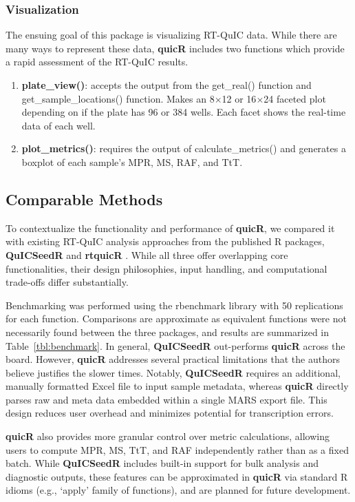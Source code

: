 \documentclass[preprint,12pt,a4paper]{elsarticle}
\begin{document}
            \subsubsection{Visualization}
                The ensuing goal of this package is visualizing RT-QuIC data. While there are many ways to represent these data, \textbf{quicR} includes two functions which provide a rapid assessment of the RT-QuIC results.
                \begin{enumerate}
                    \item \textbf{plate\_view()}: accepts the output from the get\_real() function and get\_sample\_locations() function. Makes an 8$\times$12 or 16$\times$24 faceted plot depending on if the plate has 96 or 384 wells. Each facet shows the real-time data of each well.
                    \item \textbf{plot\_metrics()}: requires the output of calculate\_metrics() and generates a boxplot of each sample's MPR, MS, RAF, and TtT.
                \end{enumerate}
        
        \subsection{Comparable Methods}
            To contextualize the functionality and performance of \textbf{quicR}, we compared it with existing RT-QuIC analysis approaches from the published R packages, \textbf{QuICSeedR} \cite{Li2025} and \textbf{rtquicR} \cite{Slota2023}. While all three offer overlapping core functionalities, their design philosophies, input handling, and computational trade-offs differ substantially.

            Benchmarking was performed using the rbenchmark library \cite{rbenchmark} with 50 replications for each function. Comparisons are approximate as equivalent functions were not necessarily found between the three packages, and results are summarized in Table~\ref{tbl:benchmark}. In general, \textbf{QuICSeedR} out-performs \textbf{quicR} across the board. However, \textbf{quicR} addresses several practical limitations that the authors believe justifies the slower times. Notably, \textbf{QuICSeedR} requires an additional, manually formatted Excel file to input sample metadata, whereas \textbf{quicR} directly parses raw and meta data embedded within a single MARS export file. This design reduces user overhead and minimizes potential for transcription errors.

            \textbf{quicR} also provides more granular control over metric calculations, allowing users to compute MPR, MS, TtT, and RAF independently rather than as a fixed batch. While \textbf{QuICSeedR} includes built-in support for bulk analysis and diagnostic outputs, these features can be approximated in \textbf{quicR} via standard R idioms (e.g., `apply' family of functions), and are planned for future development.
\end{document}
